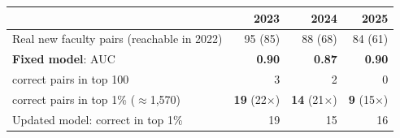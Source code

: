 \begin{tabular}{@{}lrrr@{}}
\toprule
 & 2023 & 2024 & 2025 \\
\midrule
Real new faculty pairs (reachable in 2022) & 95 (85) & 88 (68) & 84 (61) \\
\textbf{Fixed model}: AUC & \textbf{0.90} & \textbf{0.87} & \textbf{0.90} \\
\quad correct pairs in top 100 & 3 & 2 & 0 \\
\quad correct pairs in top 1\% ($\approx$1{,}570) & \textbf{19} (22$\times$) & \textbf{14} (21$\times$) & \textbf{9} (15$\times$) \\
Updated model: correct in top 1\% & 19 & 15 & 16 \\
\bottomrule
\end{tabular}

